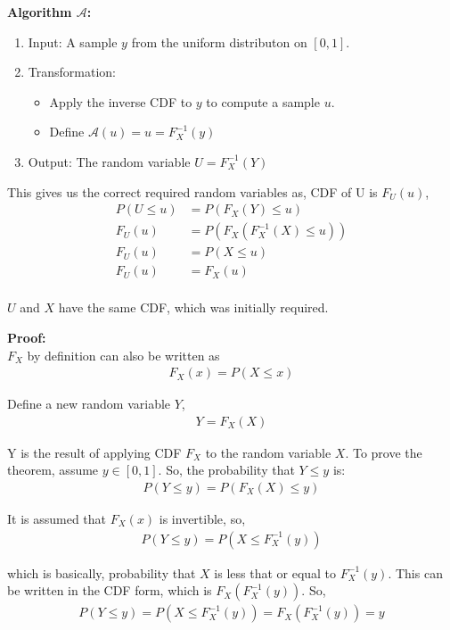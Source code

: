 \begin{solution}
	\textbf{Algorithm $\mathcal{A}$:}
	\begin{enumerate}
		\item Input: A sample $y$ from the uniform distributon on $[0,1]$.
		\item Transformation:
		      \begin{itemize}
			      \item Apply the inverse CDF to $y$ to compute a sample $u$.
			      \item Define $\mathcal{A}(u) = u = F_X^{-1}(y)$
		      \end{itemize}
		\item Output: The random variable $U = F_X^{-1}(Y)$
	\end{enumerate}

	This gives us the correct required random variables as, CDF of U is $F_U(u)$,
	\begin{align}
		P(U\leq u ) & = P(F_X(Y) \leq u)            \\
		F_U(u)      & =  P(F_X(F_X^{-1}(X) \leq u)) \\
		F_U(u)      & =  P(X \leq u)                \\
		F_U(u)      & =  F_X(u)                     \\
	\end{align}

	$U$ and $X$ have the same CDF, which was initially required.

	\textbf{Proof:}\\
	$F_X$ by definition can also be written as
	\begin{align}
		F_X(x) = P(X\leq x)
	\end{align}

	Define a new random variable $Y$,
	\begin{align}
		Y =F_X(X)
	\end{align}

	Y is the result of applying CDF $F_X$ to the random variable $X$.
	To prove the theorem, assume $y\in [0,1]$. So, the probability that $Y \leq y$ is:
	\begin{align}
		P(Y\leq y) = P(F_X(X)\leq y)
	\end{align}

	It is assumed that $F_X(x)$ is invertible, so,
	\begin{align}
		P(Y\leq y) = P(X\leq F_X^{-1}(y))
	\end{align}

	which is basically, probability that $X$ is less that or equal to $F_X^{-1}(y)$. This can be written in the CDF form, which is $F_X(F_X^{-1}(y))$. So,
	\begin{align}
		P(Y\leq y) = P(X\leq F_X^{-1}(y)) = F_X(F_X^{-1}(y)) = y
	\end{align}


\end{solution}

